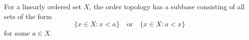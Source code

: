 For a linearly ordered set $X$, the order topology has a subbase consisting of all sets of the form
$$\{x \in X : x < a\} \quad \text{or} \quad \{x \in X : a < x\}$$
for some $a \in X$.
